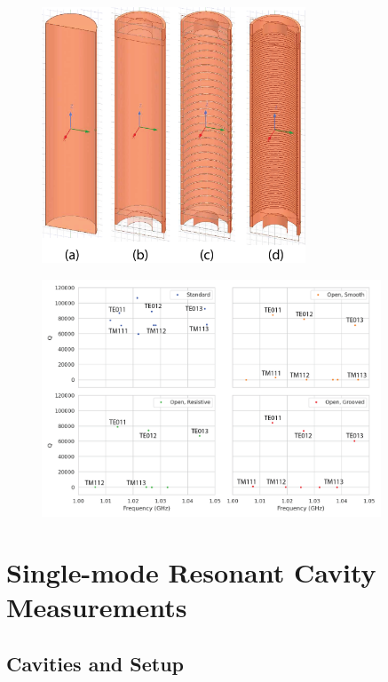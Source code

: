 \begin{figure}[htbp]
    \centering
    \includegraphics*[width=0.7\textwidth]{figs/Chapter-6/230610_cavity_variations.png}
    \caption{}
\end{figure}

\begin{figure}[htbp]
    \centering
    \includegraphics*[width=0.9\textwidth]{figs/Chapter-6/230610_cavity_variation_eigenmodes_linear_annotate.png}
    \caption{}
\end{figure}

\section{Single-mode Resonant Cavity Measurements}
\label{sec:chap6-single-mode-cavity-measurement}

\subsection{Cavities and Setup}

